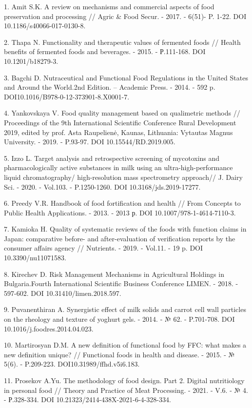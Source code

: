 \begin{references}
1. Amit S.K. A review on mechanisms and commercial aspects of food
preservation and processing // Agric \& Food Secur. - 2017. - 6(51)- P.
1-22. DOI 10.1186/s40066-017-0130-8.

2. Thapa N. Functionality and therapeutic values of fermented foods //
Health benefits of fermented foods and beverages. - 2015. - Р.111-168.
DOI 10.1201/b18279-3.

3. Bagchi D. Nutraceutical and Functional Food Regulations in the United
States and Around the World.2nd Edition. -- Academic Press. - 2014. -
592 p. DOI10.1016/B978-0-12-373901-8.X0001-7.

4. Yankovskaya V. Food quality management based on qualimetric methods
// Proceedings of the 9th International Scientific Conference Rural
Development 2019, edited by prof. Asta Raupelienė, Kaunas, Lithuania:
Vytautas Magnus University. - 2019. - P.93-97. DOI
10.15544/RD.2019.005.

5. Izzo L. Target analysis and retrospective screening of mycotoxins and
pharmacologically active substan\-ces in milk using an
ultra-high-performance liquid chromatography/ high-resolution mass
spectrometry approach// J. Dairy Sci. - 2020. - Vol.103. - P.1250-1260.
DOI 10.3168/jds.2019-17277.

6. Preedy V.R. Handbook of food fortification and health // From
Concepts to Public Health Applications. - 2013. - 2013 р. DOI
10.1007/978-1-4614-7110-3.

7. Kamioka H. Quality of systematic reviews of the foods with function
claims in Japan: comparative before- and after-evaluation of
verification reports by the consumer affairs agency // Nutrients. -
2019. - Vol.11. - 19 p. DOI 10.3390/nu11071583.

8. Kirechev D. Risk Management Mechanisms in Agricultural Holdings in
Bulgaria.Fourth International Scientific Business Conference LIMEN. -
2018. - 597-602. DOI 10.31410/limen.2018.597.

9. Puvanenthiran A. Synergistic effect of milk solids and carrot cell
wall particles on the rheology and texture of yoghurt gels. - 2014. - №
62. - P.701-708. DOI 10.1016/j.foodres.2014.04.023.

10. Martirosyan D.M. A new definition of functional food by FFC: what
makes a new definition unique? // Functional foods in health and
disease. - 2015. - № 5(6). - P.209-223. DOI10.31989/ffhd.v5i6.183.

11. Prosekov A.Yu. The methodology of food design. Part 2. Digital
nutritiology in personal food // Theory and Practice of Meat Processing.
- 2021. - V.6. - № 4. - Р.328-334. DOI
10.21323/2414-438X-2021-6-4-328-334.
\end{references}

